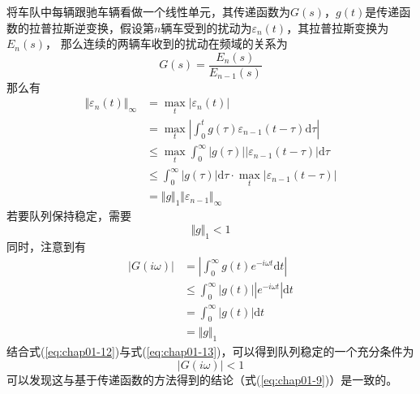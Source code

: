 将车队中每辆跟驰车辆看做一个线性单元，其传递函数为$G(s)$，$g(t)$是传递函数的拉普拉斯逆变换，假设第$n$辆车受到的扰动为$\varepsilon_n(t)$，其拉普拉斯变换为$E_n(s)$，
那么连续的两辆车收到的扰动在频域的关系为
\begin{equation}
  G(s) = \frac{E_n(s)}{E_{n-1}(s)} 
  \label{eq:chap01-10}
\end{equation}
那么有
\begin{equation}
  \begin{aligned}
  \Vert \varepsilon_n(t) \Vert_{\infty} &= \max_{t}|\varepsilon_n(t)| \\
                                        &= \max_{t} \left|\int_0^tg(\tau)\varepsilon_{n-1}(t-\tau)\mathrm{d}\tau \right| \\
                                        &\leqslant \max_{t}\int_0^{\infty}|g(\tau)||\varepsilon_{n-1}(t-\tau)| \mathrm{d}\tau \\
                                        &\leqslant \int_0^{\infty} |g(\tau)|\mathrm{d}\tau \cdot \max_t|\varepsilon_{n-1}(t-\tau)| \\
                                        &= \Vert g \Vert_1 \Vert \varepsilon_{n-1} \Vert_{\infty}
  \end{aligned}
  \label{eq:chap01-11}
\end{equation}
若要队列保持稳定，需要
\begin{equation}
  \Vert g \Vert_1 < 1 
  \label{eq:chap01-12}
\end{equation}
同时，注意到有
\begin{equation}
  \begin{aligned}
  \left| G(i\omega) \right|  &=  \left| \int_0^{\infty}g(t)e^{-i\omega t}\mathrm{d}t \right| \\
                             &\leqslant \int_0^{\infty}|g(t)||e^{-i\omega t}| \mathrm{d}t \\
                             &= \int_0^{\infty} |g(t)| \mathrm{d}t \\
                             &= \Vert g \Vert_1
  \end{aligned}
  \label{eq:chap01-13}
\end{equation}
结合式(\ref{eq:chap01-12})与式(\ref{eq:chap01-13})，可以得到队列稳定的一个充分条件为
\begin{equation}
  |G(i\omega)| < 1 
  \label{eq:chap01-14}
\end{equation}
可以发现这与基于传递函数的方法得到的结论（式(\ref{eq:chap01-9})）是一致的。 \\


